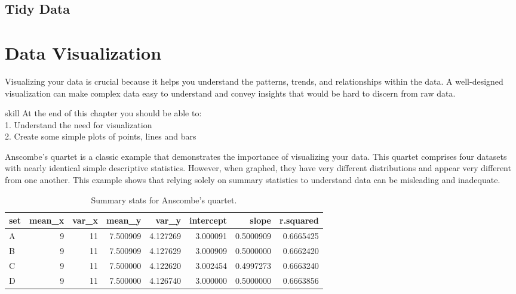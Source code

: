 \documentclass[
]{book}
\begin{document}
\hypertarget{tidy-data}{%
\section{Tidy Data}\label{tidy-data}}

\hypertarget{data-visualization}{%
\chapter{Data Visualization}\label{data-visualization}}

Visualizing your data is crucial because it helps you understand the patterns, trends, and relationships within the data. A well-designed visualization can make complex data easy to understand and convey insights that would be hard to discern from raw data.

\begin{infobox}{skill}
At the end of this chapter you should be able to:\\
1. Understand the need for visualization\\
2. Create some simple plots of points, lines and bars\\


\end{infobox}

Anscombe's quartet is a classic example that demonstrates the importance of visualizing your data. This quartet comprises four datasets with nearly identical simple descriptive statistics. However, when graphed, they have very different distributions and appear very different from one another. This example shows that relying solely on summary statistics to understand data can be misleading and inadequate.

\begin{table}

\caption{\label{tab:unnamed-chunk-65}Summary stats for Anscombe's quartet.}
\centering
\begin{tabular}[t]{l|r|r|r|r|r|r|r}
\hline
set & mean\_x & var\_x & mean\_y & var\_y & intercept & slope & r.squared\\
\hline
A & 9 & 11 & 7.500909 & 4.127269 & 3.000091 & 0.5000909 & 0.6665425\\
\hline
B & 9 & 11 & 7.500909 & 4.127629 & 3.000909 & 0.5000000 & 0.6662420\\
\hline
C & 9 & 11 & 7.500000 & 4.122620 & 3.002454 & 0.4997273 & 0.6663240\\
\hline
D & 9 & 11 & 7.500000 & 4.126740 & 3.000000 & 0.5000000 & 0.6663856\\
\hline
\end{tabular}
\end{table}
\end{document}

